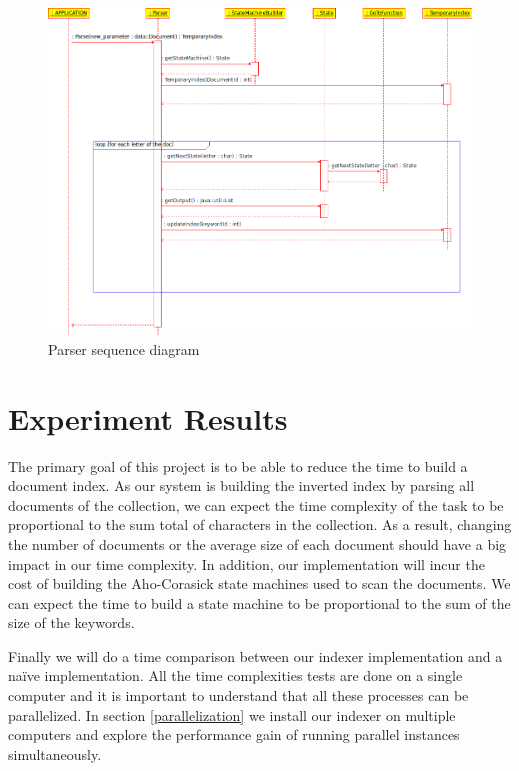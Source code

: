 \documentclass[10pt]{report}
\begin{document}
\begin{figure}[h!]
  \begin{center}
        \includegraphics[width=\textwidth,height=!]{parsersequencediagram}
  \end{center}
  \caption{Parser sequence diagram}
  \label{fig:parsersequencediagram}
\end{figure} 


\section{Experiment Results}
\label{sec:experimentresults}
The primary goal of this project is to be able to reduce the time
to build a document index. As our system is building the inverted index by
parsing all documents of the collection, we can expect the
time complexity of the task to be proportional to the sum total of
characters in the collection. As a result, changing the  
number of documents or the average size of each document should
have a big impact in our time complexity. In addition, our
implementation will incur the cost of building the Aho-Corasick state
machines used to scan the documents. We can expect the time to build a
state machine to be proportional to the sum of the size of the
keywords. 

Finally we will do a time comparison between our indexer
implementation and a na\"{i}ve implementation. All the time
complexities tests are done on a single computer and it is important
to understand that all these processes can be parallelized. In section
\ref{parallelization} we install our indexer on multiple computers and
explore the performance gain of running parallel instances
simultaneously.
\end{document}
